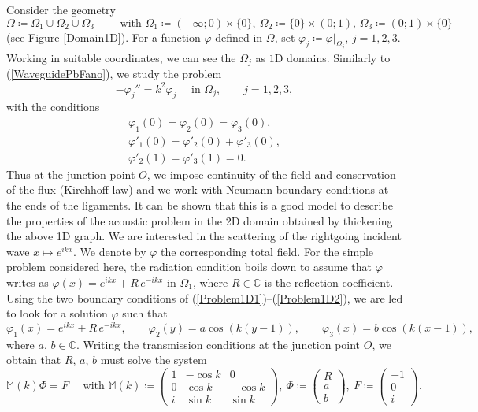 \documentclass[11pt,a4paper]{report}
\newcommand{\Om}{\Omega}
\newcommand{\mrm}[1]{\mathrm{#1}}
\newcommand{\Cplx}{\mathbb{C}}
\begin{document}
\noindent Consider the geometry 
\[
\Om\coloneqq\Om_1\cup\Om_2\cup\Om_3\qquad\mbox{ with }\Om_1\coloneqq(-\infty;0)\times\{0\},\ \Om_2\coloneqq\{0\}\times(0;1),\,\Om_3\coloneqq(0;1)\times\{0\}
\]
(see Figure \ref{Domain1D}). For a function $\varphi$ defined in $\Om$, set $\varphi_j\coloneqq\varphi|_{\Om_j}$, $j=1,2,3$. Working in suitable coordinates, we can see the $\Om_j$ as $\mrm{1D}$ domains. Similarly to (\ref{WaveguidePbFano}), we study the problem 
\begin{equation}\label{Problem1D1}
-\varphi_j''=k^2\varphi_j\quad\mbox{ in }\Om_j,\qquad j=1,2,3,
\end{equation}
with the conditions 
\begin{equation}\label{Problem1D2}
\begin{array}{|l}
\varphi_1(0)=\varphi_2(0)=\varphi_3(0),\\[2pt]
\varphi'_1(0)=\varphi'_2(0)+\varphi'_3(0),\\[2pt]
\varphi'_2(1)=\varphi'_3(1)=0.
\end{array}
\end{equation}
Thus at the junction point $O$, we impose continuity of the field and conservation of the flux (Kirchhoff law) and we work with Neumann boundary conditions at the ends of the ligaments. It can be shown that this is a good model to describe the properties of the acoustic problem in the 2D domain obtained by thickening the above 1D graph. We are interested in the scattering of the rightgoing incident wave $x\mapsto  e^{ikx}$. We denote by $\varphi$ the corresponding total field. For the simple problem considered here, the radiation condition boils down to assume that $\varphi$ writes as $\varphi(x)=e^{ikx}+R\,e^{-ikx}$ in $\Om_1$, where $R\in\Cplx$ is the reflection coefficient. Using the two boundary conditions of (\ref{Problem1D1})--(\ref{Problem1D2}), we are led to look for a solution $\varphi$ such that
\[
\varphi_1(x)=e^{ikx}+R\,e^{-ikx},\qquad \varphi_2(y)=a\cos(k(y-1)),\qquad \varphi_3(x)=b\cos(k(x-1)),
\]
where $a$, $b\in\Cplx$. Writing the transmission conditions at the junction point $O$, we obtain that $R$, $a$, $b$ must solve the system
\begin{equation}\label{system33}
\mathbb{M}(k)\Phi=F\quad\mbox{ with }\mathbb{M}(k)\coloneqq\left(\begin{array}{ccc}
1 & -\cos k & 0\\
0 & \cos k & -\cos k\\
i & \sin k & \sin k
\end{array}\right),\  \Phi\coloneqq\left(\begin{array}{c}
R \\
a \\
b
\end{array}\right),\  F\coloneqq\left(\begin{array}{c}
-1 \\
0 \\
i
\end{array}\right).
\end{equation}
\end{document}
